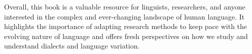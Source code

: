 \begin{refsection}
Overall, this book is a valuable resource for linguists, researchers, and anyone interested in the complex and ever-changing landscape of human language. It highlights the importance of adapting research methods to keep pace with the evolving nature of language and offers fresh perspectives on how we study and understand dialects and language variation.

\end{refsection}
